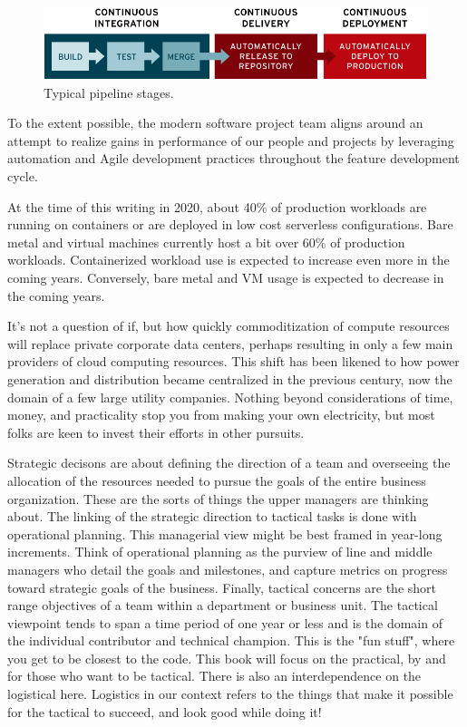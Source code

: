 \begin{figure}[!htb]
	\centering
	\includegraphics[scale=0.35]{../images/ci-cd-flow-desktop_0.png}
	\caption{Typical pipeline stages.}
	\label{fig:stages}
\end{figure}

\justify
To the extent possible, the modern software project team aligns around an
attempt to realize gains in performance of our people and projects by 
leveraging automation and Agile development practices throughout the 
feature development cycle.

\justify
At the time of this writing in 2020, about 40\% of production workloads are
running on containers or are deployed in low cost serverless configurations.
Bare metal and virtual machines currently host a bit over 60\% of production
workloads. Containerized workload use is expected to increase even more in
the coming years. Conversely, bare metal and VM usage is expected to
decrease in the coming years.

\justify
It's not a question of if, but how quickly commoditization of compute resources
will replace private corporate data centers, perhaps resulting in only a
few main providers of cloud computing resources. This shift has been likened 
to how power generation and distribution became centralized
in the previous century, now the domain of a few large utility companies.
Nothing beyond considerations of time, money, and practicality stop you
from making your own electricity, but most folks are keen to invest their
efforts in other pursuits.

\justify
Strategic decisons are about defining the direction of a team and overseeing 
the allocation of the resources needed to pursue the goals of the entire 
business organization. These are the sorts of things the upper managers are
thinking about. The linking of the strategic direction to tactical tasks is 
done with operational planning. This managerial view might be best framed in
year-long increments. Think of operational planning as the purview of line
and middle managers who detail the goals and milestones, and capture metrics
on progress toward strategic goals of the business. Finally, tactical concerns
are the short range objectives of a team within a department or business unit.
The tactical viewpoint tends to span a time period of one year or less and is
the domain of the individual contributor and technical champion. This is the
"fun stuff", where you get to be closest to the code. This book will focus 
on the practical, by and for those who want to be tactical. There is also 
an interdependence on the logistical here. Logistics in our context refers to
the things that make it possible for the tactical to succeed, and look good 
while doing it!

